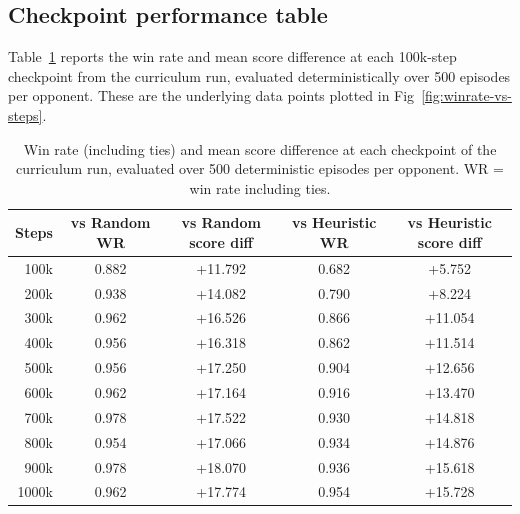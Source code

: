 \documentclass[10pt]{article}
\begin{document}
\subsection{Checkpoint performance table}

Table~\ref{tab:checkpoint-perf} reports the win rate and mean score difference at each 100k-step checkpoint from the curriculum run, evaluated deterministically over 500 episodes per opponent. These are the underlying data points plotted in Fig~\ref{fig:winrate-vs-steps}.

\begin{table}[H]
\centering
\begin{tabularx}{\textwidth}{@{}rcccc@{}}
\toprule
Steps & vs Random WR & vs Random score diff & vs Heuristic WR & vs Heuristic score diff \\
\midrule
100k  & 0.882 & +11.792 & 0.682 & +5.752  \\
200k  & 0.938 & +14.082 & 0.790 & +8.224  \\
300k  & 0.962 & +16.526 & 0.866 & +11.054 \\
400k  & 0.956 & +16.318 & 0.862 & +11.514 \\
500k  & 0.956 & +17.250 & 0.904 & +12.656 \\
600k  & 0.962 & +17.164 & 0.916 & +13.470 \\
700k  & 0.978 & +17.522 & 0.930 & +14.818 \\
800k  & 0.954 & +17.066 & 0.934 & +14.876 \\
900k  & 0.978 & +18.070 & 0.936 & +15.618 \\
1000k & 0.962 & +17.774 & 0.954 & +15.728 \\
\bottomrule
\end{tabularx}
\caption{Win rate (including ties) and mean score difference at each checkpoint of the curriculum run, evaluated over 500 deterministic episodes per opponent. WR = win rate including ties.}
\label{tab:checkpoint-perf}
\end{table}
\end{document}
